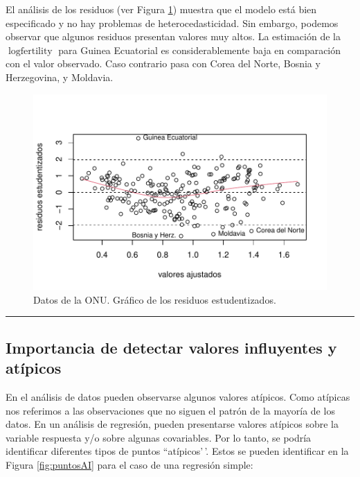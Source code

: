 \documentclass[
]{article}
\begin{document}
El análisis de los residuos (ver Figura \ref{fig:Un11resFig}) muestra que el modelo está bien especificado y no hay problemas de heterocedasticidad. Sin embargo, podemos observar que algunos residuos presentan valores muy altos. La estimación de la \(\log \mbox{fertility}\) para Guinea Ecuatorial es considerablemente baja en comparación con el valor observado. Caso contrario pasa con Corea del Norte, Bosnia y Herzegovina, y Moldavia.

\begin{figure}

{\centering \includegraphics{MLGI_files/figure-latex/Un11resFig-1} 

}

\caption{Datos de la ONU. Gráfico de los residuos estudentizados.}\label{fig:Un11resFig}
\end{figure}
\rule{\textwidth}{0.4pt}

\hypertarget{importancia-de-detectar-valores-influyentes-y-atuxedpicos}{%
\subsection{Importancia de detectar valores influyentes y atípicos}\label{importancia-de-detectar-valores-influyentes-y-atuxedpicos}}

En el análisis de datos pueden observarse algunos valores atípicos. Como atípicas nos referimos a las observaciones que no siguen el patrón de la mayoría de los datos. En un análisis de regresión, pueden presentarse valores atípicos sobre la variable respuesta y/o sobre algunas covariables. Por lo tanto, se podría identificar diferentes tipos de puntos ``atípicos'\,'. Estos se pueden identificar en la Figura \ref{fig:puntosAI} para el caso de una regresión simple:
\end{document}
